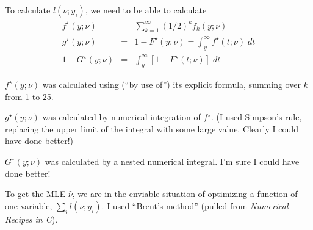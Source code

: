 \documentclass[12pt,letterpaper]{article}
\begin{document}
\bigskip

To calculate $l(\nu; y_i)$, we need to be able to calculate
\begin{eqnarray*}
f^\star(y;\nu) & = & \sum_{k=1}^\infty (1/2)^k f_k(y;\nu) \\
g^\star(y;\nu) & = & 1 - F^\star(y; \nu) = \int_{y}^\infty
f^\star(t;\nu) \; dt \\
1 - G^\star(y;\nu) & = & \int_{y}^\infty [1-F^\star(t;\nu)] \; dt
\end{eqnarray*}

\bigskip

$f^\star(y;\nu)$ was calculated using (``by use of'') its explicit
formula, summing over $k$ from 1 to 25.

\bigskip

$g^\star(y;\nu)$ was calculated by numerical integration of
$f^\star$. (I used Simpson's rule, replacing the upper limit of the
integral with some large value.  Clearly I could have done better!)

\bigskip

$G^\star(y;\nu)$ was calculated by a nested numerical integral.  I'm
sure I could have done better!

\bigskip \bigskip

To get the MLE $\hat{\nu}$, we are in the enviable situation of
optimizing a function of one variable, $\sum_i l(\nu; y_i)$.  I used
``Brent's method'' (pulled from \emph{Numerical Recipes in C}).
\end{document}
